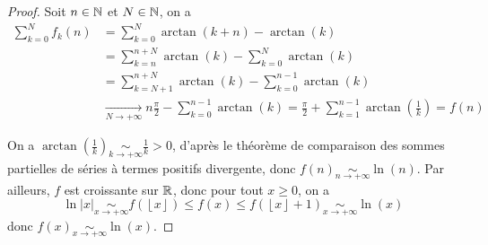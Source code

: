 \begin{proof}
    Soit $n\in\mathbb{N}$ et $N\in\mathbb{N}$, on a 
    \begin{align}
        \sum_{k=0}^{N}f_{k}(n)
        &=\sum_{k=0}^{N}\arctan(k+n)-\arctan(k)\\
        &=\sum_{k=n}^{n+N}\arctan(k)-\sum_{k=0}^{N}\arctan(k)\\
        &=\sum_{k=N+1}^{n+N}\arctan(k)-\sum_{k=0}^{n-1}\arctan(k)\\
        &\xrightarrow[N\to+\infty]{}n\frac{\pi}{2}-\sum_{k=0}^{n-1}\arctan(k)=\frac{\pi}{2}+\sum_{k=1}^{n-1}\arctan(\frac{1}{k})=f(n)
    \end{align}

    On a $\arctan\left(\frac{1}{k}\right)\underset{k\to+\infty}{\sim}\frac{1}{k}>0$, d'après le théorème de comparaison des sommes partielles de séries à termes positifs divergente, donc $f(n)\underset{n\to+\infty}{\sim}\ln(n)$. Par ailleurs, $f$ est croissante sur $\mathbb{R}$, donc pour tout $x\geqslant0$, on a 
    \begin{equation}
        \ln\left\lvert x\right\rvert\underset{x\to+\infty}{\sim}f\left(\left\lfloor x\right\rfloor\right)\leqslant f(x)\leqslant f\left(\left\lfloor x\right\rfloor+1\right)\underset{x\to+\infty}{\sim}\ln(x)
    \end{equation}
    donc $f(x)\underset{x\to+\infty}{\sim}\ln(x)$.
\end{proof}

